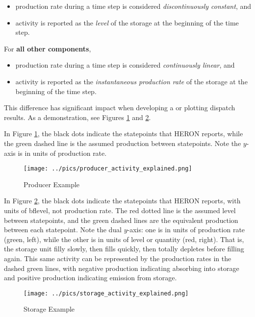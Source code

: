 \begin{itemize}
  \item production rate during a time step is considered \emph{discontinuously constant}, and
  \item activity is reported as the \emph{level} of the storage at the beginning of the time step.
\end{itemize}
For \textbf{all other components},
\begin{itemize}
  \item production rate during a time step is considered \emph{continuously linear}, and
  \item activity is reported as the \emph{instantaneous production rate} of the storage at the
        beginning of the time step.
\end{itemize}
This difference has significant impact when developing a  or plotting dispatch
results. As a demonstration, see Figures \ref{fig:producer_example} and \ref{fig:storage_example}.

In Figure \ref{fig:producer_example}, the black dots indicate the statepoints that HERON reports,
while the green dashed line is the assumed production between statepoints. Note the
$y$-axis is in units of production rate.

\begin{figure}[h!]
  \centering
  \texttt{[image: ../pics/producer\_activity\_explained.png]}
  \caption{Producer Example}
  \label{fig:producer_example}
\end{figure}

In Figure \ref{fig:storage_example}, the black dots indicate the statepoints that HERON reports,
with units of bf{level}, not production rate. The red dotted line is the assumed level between
statepoints, and the green dashed lines are the equivalent production between each statepoint.
Note the dual $y$-axis: one is in units of production rate (green, left), while the other is in units of level or
quantity (red, right). That is, the storage unit filly slowly, then fills quickly, then totally depletes before
filling again. This same activity can be represented by the production rates in the dashed green
lines, with negative production indicating absorbing into storage and positive production indicating
emission from storage.
\begin{figure}[h!]
  \centering
  \texttt{[image: ../pics/storage\_activity\_explained.png]}
  \caption{Storage Example}
  \label{fig:storage_example}
\end{figure}

